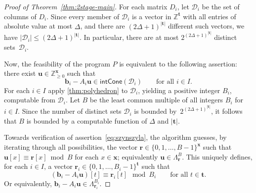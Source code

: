 \documentclass{theoretics}
\renewcommand{\leq}{\leqslant}
\renewcommand{\geq}{\geqslant}
\newcommand{\Dd}{\mathcal{D}}
\newcommand{\Z}{\mathbb{Z}}
\newcommand{\Zn}{\Z_{\geq 0}}
\newcommand{\tup}[1]{{\mathbf{#1}}}
\newcommand{\xx}{\tup x}
\newcommand{\tv}{\tup t}
\newcommand{\bb}{\tup b}
\newcommand{\rr}{\tup r}
\newcommand{\uu}{\tup u}
\newcommand{\intcone}{\mathsf{intCone}}
\begin{document}
\begin{proof}[Proof of Theorem~\ref{thm:2stage-main}]
 For each matrix $D_i$, let $\Dd_i$ be the set of columns of $D_i$. Since every member of $\Dd_i$ is a vector in $\Z^\tv$ with all entries of absolute value at most $\Delta$, and there are $(2\Delta+1)^{|\tv|}$ different such vectors, we have $|\Dd_i|\leq (2\Delta+1)^{|\tv|}$. In particular, there are at most $2^{(2\Delta+1)^{|\tv|}}$ distinct sets~$\Dd_i$.

 Now, the feasibility of the program $P$ is equivalent to the following assertion: there exist $\uu\in \Zn^\xx$ such that
 \begin{equation}\label{eq:szynszyla}
   \bb_i-A_i\uu\in \intcone(\Dd_i)\qquad\textrm{for all }i\in I.
 \end{equation}
 For each $i\in I$ apply \cref{thm:polyhedron} to $\Dd_i$, yielding a positive integer $B_i$, computable from $\Dd_i$. Let $B$ be the least common multiple of all integers $B_i$ for $i\in I$. Since the number of distinct sets $\Dd_i$ is bounded by~$2^{(2\Delta+1)^{|\tv|}}$, it follows that $B$ is bounded by a computable function of $\Delta$ and $|\tv|$.

 Towards verification of assertion~\cref{eq:szynszyla}, the algorithm guesses, by iterating through all possibilities, the vector $\rr\in \{0,1,\ldots,B-1\}^{\xx}$ such that $\uu[x]\equiv \rr[x]\bmod B$ for each $x\in \xx$; equivalently $\uu\in \Lambda_\rr^B$. This uniquely defines, for each $i\in I$, a vector $\rr_i\in \{0,1,\ldots,B_i-1\}^{\tv}$ such that
 $$(\bb_i-A_i\uu)[t]\equiv \rr_i[t]\mod B_i\qquad\textrm{for all }t\in \tv.$$
 Or equivalently, $\bb_i-A_i\uu\in \Lambda^{B_i}_{\rr_i}$.


\end{proof}
\end{document}
